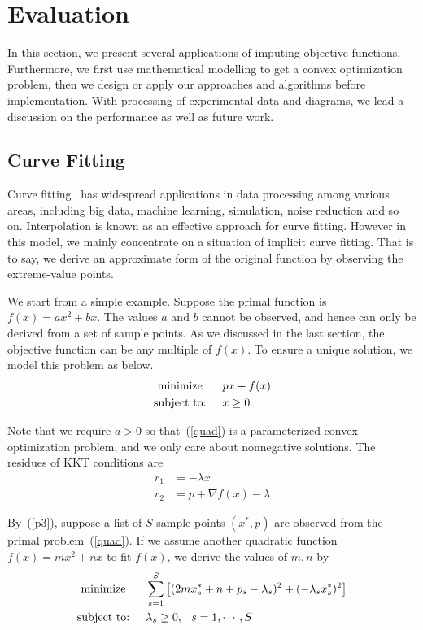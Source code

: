 \section{Evaluation}\label{sec:evaluation}

In this section, we present several applications of imputing objective functions. Furthermore, we first use mathematical modelling to get a convex optimization problem, then we design or apply our approaches and algorithms before implementation. With processing of experimental data and diagrams, we lead a discussion on the performance as well as future work.

\subsection{Curve Fitting}

Curve fitting~\cite{arlinghaus1994} has widespread applications in data processing among various areas, including big data, machine learning, simulation, noise reduction and so on. Interpolation is known as an effective approach for curve fitting. However in this model, we mainly concentrate on a situation of implicit curve fitting. That is to say, we derive an approximate form of the original function by observing the extreme-value points.

We start from a simple example. Suppose the primal function is $f(x)=ax^2+bx$. The values $a$ and $b$ cannot be observed, and hence can only be derived from a set of sample points. As we discussed in the last section, the objective function can be any multiple of $f(x)$. To ensure a unique solution, we model this problem as below.
\begin{align}
\begin{split}\label{quad}
\textrm{minimize }\hspace{.2in}&px+f(x)\\
\textrm{subject to:}\hspace{.2in}&x\ge0
\end{split}
\end{align}

Note that we require $a>0$ so that~(\ref{quad}) is a parameterized convex optimization problem, and we only care about nonnegative solutions. The residues of KKT conditions are
\begin{align*}
r_1 &= -\lambda x\\
r_2 &= p+\nabla f(x)-\lambda
\end{align*}

By~(\ref{p3}), suppose a list of $S$ sample points $(x^*,p)$ are observed from the primal problem~(\ref{quad}). If we assume another quadratic function $\tilde{f}(x)=mx^2+nx$ to fit $f(x)$, we derive the values of $m,n$ by
\begin{align*}
\begin{split}
\textrm{minimize }\hspace{.2in}&\sum_{s=1}^S\left[(2mx_s^*+n+p_s-\lambda_s)^2+(-\lambda_s x_s^*)^2\right]\\
\textrm{subject to:}\hspace{.2in}&\lambda_s\ge0,\hspace{.1in}s=1,\cdots,S
\end{split}
\end{align*}

